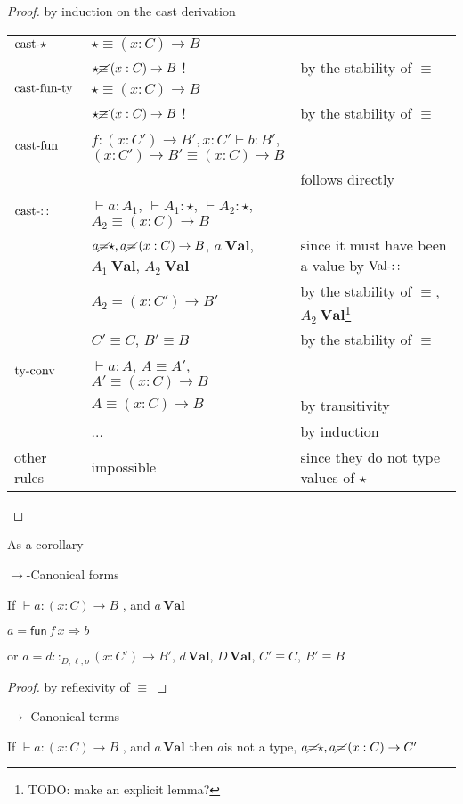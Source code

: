 \begin{proof}
by induction on the cast derivation

\begin{tabular}{lll}
$\operatorname{cast-\star}$ & $\star\equiv\left(x:C\right)\rightarrow B$ & \tabularnewline
 & $\star\cancel{\equiv}\left(x:C\right)\rightarrow B$ ! & by the stability of $\equiv$\tabularnewline
$\operatorname{cast-fun-ty}$ & $\star\equiv\left(x:C\right)\rightarrow B$ & \tabularnewline
 & $\star\cancel{\equiv}\left(x:C\right)\rightarrow B$ ! & by the stability of $\equiv$\tabularnewline
$\operatorname{cast-fun}$ & \multicolumn{2}{l}{$f:\left(x:C'\right)\rightarrow B',x:C'\vdash b:B'$, $\left(x:C'\right)\rightarrow B'\equiv\left(x:C\right)\rightarrow B$}\tabularnewline
 &  & follows directly\tabularnewline
$\operatorname{cast-::}$ & $\vdash a:A_{1}$, $\vdash A_{1}:\star$, $\vdash A_{2}:\star$, $A_{2}\equiv\left(x:C\right)\rightarrow B$ & \tabularnewline
 & $a\cancel{=}\star,a\cancel{=}\left(x:C\right)\rightarrow B$, $a\:\textbf{Val}$,
$A_{1}\:\textbf{Val}$, $A_{2}\:\textbf{Val}$ & since it must have been a value by $\operatorname{Val-::}$\tabularnewline
 & $A_{2}=\left(x:C'\right)\rightarrow B'$ & by the stability of $\equiv$, $A_{2}\:\textbf{Val}$\footnote{TODO: make an explicit lemma?}\tabularnewline
 & $C'\equiv C$, $B'\equiv B$ & by the stability of $\equiv$\tabularnewline
$\operatorname{ty-conv}$ & $\vdash a:A$, $A\equiv A'$, $A'\equiv\left(x:C\right)\rightarrow B$ & \tabularnewline
 & $A\equiv\left(x:C\right)\rightarrow B$ & by transitivity\tabularnewline
 & ... & by induction\tabularnewline
other rules & impossible & since they do not type values of $\star$\tabularnewline
\end{tabular}
\end{proof}
As a corollary
\begin{cor}
$\rightarrow$-Canonical forms

If $\vdash a:\left(x:C\right)\rightarrow B$ , and $a\,\textbf{Val}$

$a=\mathsf{fun}\,f\,x\Rightarrow b$ 

or $a=d::_{D,\ell ,o}\left(x:C'\right)\rightarrow B'$,
$d\,\textbf{Val}$, $D\,\textbf{Val}$, $C'\equiv C$, $B'\equiv B$ 
\end{cor}

\begin{proof}
by reflexivity of $\equiv$
\end{proof}
\begin{cor}
$\rightarrow$-Canonical terms

If $\vdash a:\left(x:C\right)\rightarrow B$ , and $a\,\textbf{Val}$
then $a$is not a type, $a\cancel{=}\star,a\cancel{=}\left(x:C\right)\rightarrow C'$
\end{cor}

